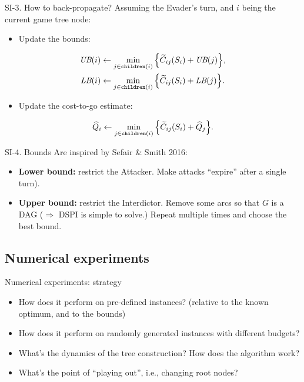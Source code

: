 \documentclass[10pt, xcolor=svgnames]{beamer}
\begin{document}
\begin{frame}[label={sec:org77c5c63}]{SI-3. How to back-propagate?}
Assuming the Evader's turn, and \(i\) being the current game tree node:
\begin{itemize}
\item Update the bounds:
\end{itemize}
\begin{align*}
  \UB{i} &\gets \min_{j\in\children{i}} \Big\{ \widetilde{C}_{ij}(S_i) + \UB{j} \Big\},\\
  \LB{i} &\gets \min_{j\in\children{i}} \Big\{ \widetilde{C}_{ij}(S_i) + \LB{j} \Big\}.
\end{align*}

\begin{itemize}
\item Update the cost-to-go estimate:
\end{itemize}
\begin{equation*}
\widehat{Q}_i \gets \min_{j\in\texttt{children}(i)} \Big\{ \widetilde{C}_{ij}(S_i) + \widehat{Q}_j\Big\}.
\end{equation*}
\end{frame}
\begin{frame}[label={sec:org0f96b49}]{SI-4. Bounds}
Are inspired by Sefair \& Smith 2016:
\begin{itemize}
\item \textbf{Lower bound:} restrict the \alert{Attacker}. Make attacks ``expire'' after a single turn).
\item \textbf{Upper bound:} restrict the \alert{Interdictor}. Remove some arcs so that \(G\) is a DAG (\(\Rightarrow\) DSPI is simple to solve.) Repeat multiple times and choose the best bound.
\end{itemize}
\end{frame}
\subsection{Numerical experiments}
\label{sec:org72ac1bb}
\begin{frame}[label={sec:org03abae9}]{Numerical experiments: strategy}
\begin{itemize}
\item How does it perform on pre-defined instances? (relative to the known optimum, and to the bounds)
\item How does it perform on randomly generated instances with different budgets?
\item What's the dynamics of the tree construction? How does the algorithm work?
\item What's the point of ``playing out'', i.e., changing root nodes?
\end{itemize}
\end{frame}
\end{document}
